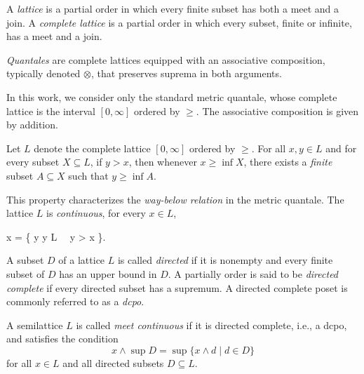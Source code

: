 \begin{definition}
   A \emph{lattice} is a partial order in which every finite subset has both a meet and a join. A \emph{complete lattice} is a partial order  in which every subset, finite or infinite, has a meet and a join.
\end{definition}

\begin{definition}
  \emph{Quantales} are complete lattices equipped with an associative composition, typically denoted $\otimes$, that preserves suprema in both arguments.
\end{definition}

\begin{example}
  In this work, we consider only the standard metric quantale, whose complete lattice is the interval $[0, \infty]$ ordered by $\geq$. The associative composition is given by addition.
\end{example}


\begin{lemma} \cite{dahlqvist2022syntactic}
Let $L$ denote the complete lattice $[0, \infty]$ ordered by $\geq$.  
For all $x, y \in L$ and for every subset $X \subseteq L$, if $y > x$, then whenever $x \geq \inf X$, there exists a \emph{finite} subset $A \subseteq X$ such that $y \geq \inf A$.

This property characterizes the \emph{way-below relation} in the metric quantale. The lattice $L$ is \emph{continuous}, \ie for every $x \in L$,
	\begin{flalign*}
		x = \inf \{ y  \mid y \in L\  \ y > x \}.
	\end{flalign*}
\end{lemma}


\begin{definition}
  A subset $D$ of a lattice $L$ is called \emph{directed} if it is nonempty and every finite subset of $D$ has an upper bound in $D$. A partially order is said to be \emph{directed complete} if every directed subset has a supremum. A directed complete poset is commonly referred to as a \emph{dcpo}.
\end{definition}

\begin{definition}
  A semilattice $L$ is called \emph{meet continuous} if it is directed complete, i.e., a dcpo, and satisfies the condition
  \[
    x \wedge \sup D = \sup \{x \wedge d \mid d \in D\} \tag{MC}
  \]
  for all $x \in L$ and all directed subsets $D \subseteq L$.
\end{definition}

